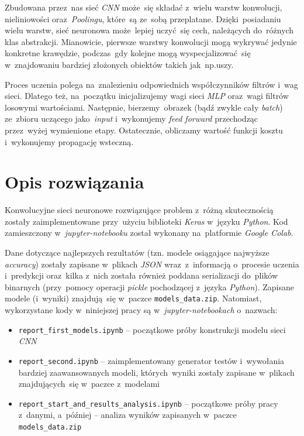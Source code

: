 \documentclass[11pt, a4paper]{article}
\begin{document}
Zbudowana przez~nas sieć \textit{CNN} może~się składać z~wielu warstw konwolucji, nieliniowości oraz~\textit{Poolingu}, które~są ze~sobą przeplatane. Dzięki~posiadaniu wielu warstw, sieć neuronowa może~lepiej uczyć~się cech, należących do~różnych klas abstrakcji. Mianowicie, pierwsze warstwy konwolucji mogą wykrywać jedynie konkretne krawędzie, podczas~gdy kolejne mogą wyspecjalizować~się w~znajdowaniu bardziej złożonych obiektów takich jak~np.uszy.

Proces uczenia polega na~znalezieniu odpowiednich współczynników filtrów i~wag sieci. Dlatego też, na~początku inicjalizujemy wagi sieci \textit{MLP} oraz~wagi filtrów losowymi wartościami.
Następnie, bierzemy~obrazek (bądź zwykle cały \textit{batch}) ze~zbioru uczącego jako~\textit{input} i~wykonujemy \textit{feed forward} przechodząc przez~wyżej wymienione etapy.
Ostatecznie, obliczamy wartość funkcji kosztu i~wykonujemy propagację wsteczną.

\section{Opis rozwiązania}
Konwolucyjne sieci neuronowe rozwiązujące problem z~różną skutecznością zostały zaimplementowane przy~użyciu biblioteki \textit{Keras} w~języku \textit{Python}. Kod zamieszczony w~\textit{jupyter-notebooku} został wykonany na~platformie \textit{Google Colab}. 

Dane dotyczące najlepszych rezultatów (tzn. modele osiągające najwyższe \textit{accuracy}) zostały zapisane w~plikach \textit{JSON} wraz~z~informacją o~procesie uczenia
i~predykcji oraz~kilka z~nich została również poddana serializacji do~plików binarnych (przy~pomocy operacji \textit{pickle} pochodzącej z~języka \textit{Python}).
Zapisane modele (i~wyniki) znajdują~się w~paczce \texttt{models\_data.zip}. Natomiast, wykorzystane kody w~niniejszej pracy są w~\textit{jupyter-notebookach} o~nazwach:
\begin{itemize}
 \item \texttt{report\_first\_models.ipynb} -- początkowe próby konstrukcji modelu sieci \textit{CNN}
 \item \texttt{report\_second.ipynb} -- zaimplementowany generator testów i~wywołania bardziej zaawansowanych modeli, których~wyniki zostały
zapisane w~plikach znajdujących~się w~paczce z~modelami
\item \texttt{report\_start\_and\_results\_analysis.ipynb} -- początkowe próby pracy z~danymi, a~później -- analiza wyników zapisanych w~paczce \texttt{models\_data.zip}
\end{itemize}
\end{document}
